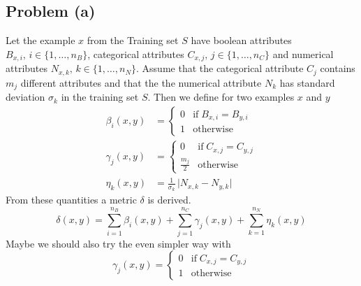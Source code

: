 \subsection*{Problem (a)}

Let the example $x$ from the Training set $S$ have boolean attributes
$B_{x,i},\, i\in\{1,\ldots,n_{B}\}$, categorical attributes $C_{x,j},\, j\in\{1,\ldots,n_{C}\}$
and numerical attributes $N_{x,k},\, k\in\{1,\ldots,n_{N}\}$. Assume
that the categorical attribute $C_{j}$ contains $m_{j}$ different
attributes and that the the numerical attribute $N_{k}$ has standard
deviation $\sigma_{k}$ in the training set $S$. Then we define for
two examples $x$ and $y$
\begin{align*}
\beta_{i}(x,y) & =\begin{cases}
0 & \text{if}\; B_{x,i}=B_{y,i}\\
1 & \text{otherwise}
\end{cases}\\
\gamma_{j}(x,y) & =\begin{cases}
0 & \text{if}\; C_{x,j}=C_{y,j}\\
\frac{m_{j}}{2} & \text{otherwise}
\end{cases}\\
\eta_{k}(x,y) & =\frac{1}{\sigma_{k}}\,\vert N_{x,k}-N_{y,k}\vert
\end{align*}
From these quantities a metric $\delta$ is derived.
\[
\delta(x,y)=\sum_{i=1}^{n_{B}}\beta_{i}(x,y)+\sum_{j=1}^{n_{C}}\gamma_{j}(x,y)+\sum_{k=1}^{n_{N}}\eta_{k}(x,y)
\]
Maybe we should also try the even simpler way with
\[
\gamma_{j}(x,y)=\begin{cases}
0 & \text{if}\; C_{x,j}=C_{y,j}\\
1 & \text{otherwise}
\end{cases}
\]
